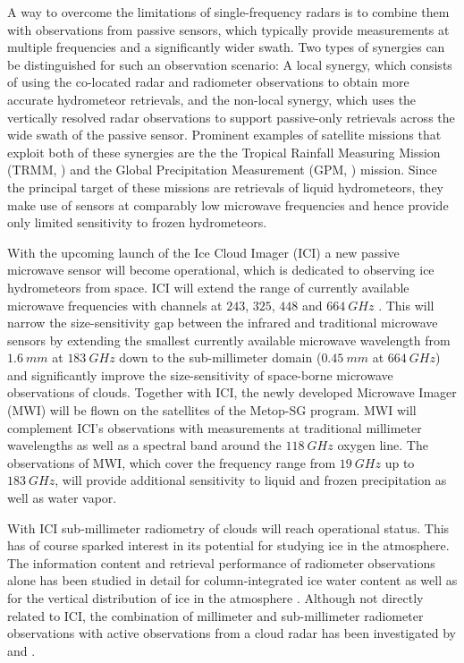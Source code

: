 \documentclass[journal abbreviation, manuscript]{copernicus}
\begin{document}
A way to overcome the limitations of single-frequency radars is to combine them
with observations from passive sensors, which typically provide measurements at
multiple frequencies and a significantly wider swath. Two types of synergies can
be distinguished for such an observation scenario: A local synergy, which
consists of using the co-located radar and radiometer observations to obtain
more accurate hydrometeor retrievals, and the non-local synergy, which uses the
vertically resolved radar observations to support passive-only retrievals
across the wide swath of the passive sensor. Prominent examples of satellite
missions that exploit both of these synergies are the the Tropical Rainfall
Measuring Mission (TRMM, \citet{kummerow98, grecu04, munchak11}) and the Global
Precipitation Measurement (GPM, \cite{hou14, grecu16, kummerow15}) mission.
Since the principal target of these missions are retrievals of liquid
hydrometeors, they make use of sensors at comparably low microwave frequencies
and hence provide only limited sensitivity to frozen hydrometeors.

With the upcoming launch of the Ice Cloud Imager (ICI) a new passive microwave
sensor will become operational, which is dedicated to observing ice hydrometeors
from space. ICI will extend the range of currently available microwave
frequencies with channels at $243$, $325$, $448$ and $664\ \unit{GHz}$
\citep{eriksson20}. This will narrow the size-sensitivity gap between the
infrared and traditional microwave sensors by extending the smallest currently
available microwave wavelength from $1.6\ \unit{mm}$ at $183\ \unit{GHz}$ down
to the sub-millimeter domain ($0.45\ \unit{mm}$ at $664\ \unit{GHz}$) and
significantly improve the size-sensitivity of space-borne microwave observations
of clouds. Together with ICI, the newly developed Microwave Imager (MWI) will be
flown on the satellites of the Metop-SG program. MWI will complement ICI's
observations with measurements at traditional millimeter wavelengths as well as
a spectral band around the $118\ \unit{GHz}$ oxygen line. The observations
of MWI, which cover the frequency range from $19\ \unit{GHz}$ up to
$183\ \unit{GHz}$, will provide additional sensitivity to liquid and frozen
precipitation as well as water vapor.

With ICI sub-millimeter radiometry of clouds will reach operational status.
This has of course sparked interest in its potential for studying ice in the
atmosphere. The information content and retrieval performance of radiometer
observations alone has been studied in detail for column-integrated ice water
content \citep{jimenez07, wang17, brath18a, eriksson20} as well as for the
vertical distribution of ice in the atmosphere \citep{birman17, grutzun18,
  aires19}. Although not directly related to ICI, the combination of millimeter
and sub-millimeter radiometer observations with active observations from a cloud
radar has been investigated by \cite{evans05} and \cite{jiang19}.
\end{document}
